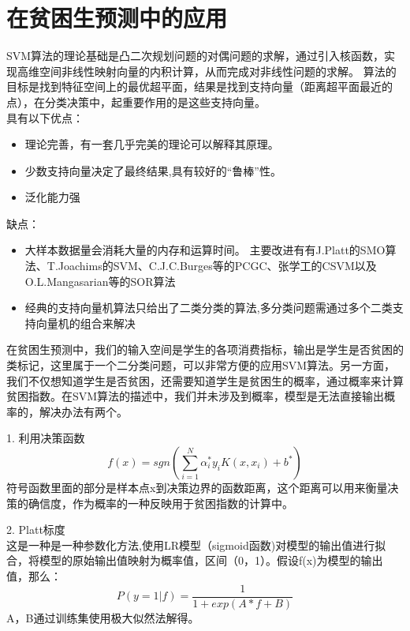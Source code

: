 \chapter{在贫困生预测中的应用}
SVM算法的理论基础是凸二次规划问题的对偶问题的求解，通过引入核函数，实现高维空间非线性映射向量的内积计算，从而完成对非线性问题的求解。
算法的目标是找到特征空间上的最优超平面，结果是找到支持向量（距离超平面最近的点），在分类决策中，起重要作用的是这些支持向量。\\
具有以下优点：
\begin{itemize}
    \item 理论完善，有一套几乎完美的理论可以解释其原理。
    \item 少数支持向量决定了最终结果,具有较好的“鲁棒”性。
    \item 泛化能力强
\end{itemize}
缺点：
\begin{itemize}
    \item 大样本数据量会消耗大量的内存和运算时间。
    主要改进有有J.Platt的SMO算法、T.Joachims的SVM、C.J.C.Burges等的PCGC、张学工的CSVM以及O.L.Mangasarian等的SOR算法
    \item 经典的支持向量机算法只给出了二类分类的算法,多分类问题需通过多个二类支持向量机的组合来解决
\end{itemize}

在贫困生预测中，我们的输入空间是学生的各项消费指标，输出是学生是否贫困的类标记，这里属于一个二分类问题，可以非常方便的应用SVM算法。另一方面，我们不仅想知道学生是否贫困，还需要知道学生是贫困生的概率，通过概率来计算贫困指数。在SVM算法的描述中，我们并未涉及到概率，模型是无法直接输出概率的，解决办法有两个。

1. 利用决策函数
$$ f(x) = sgn(\sum_{i=1}^N \alpha_i^* y_i K(x, x_i) +b^*) $$
符号函数里面的部分是样本点x到决策边界的函数距离，这个距离可以用来衡量决策的确信度，作为概率的一种反映用于贫困指数的计算中。

2. Platt标度\\
这是一种是一种参数化方法,使用LR模型（sigmoid函数)对模型的输出值进行拟合，将模型的原始输出值映射为概率值，区间（0，1）。假设f(x)为模型的输出值，那么：
$$
    P(y=1|f) = \frac{1}{1+exp(A*f+B)}
$$
A，B通过训练集使用极大似然法解得。
